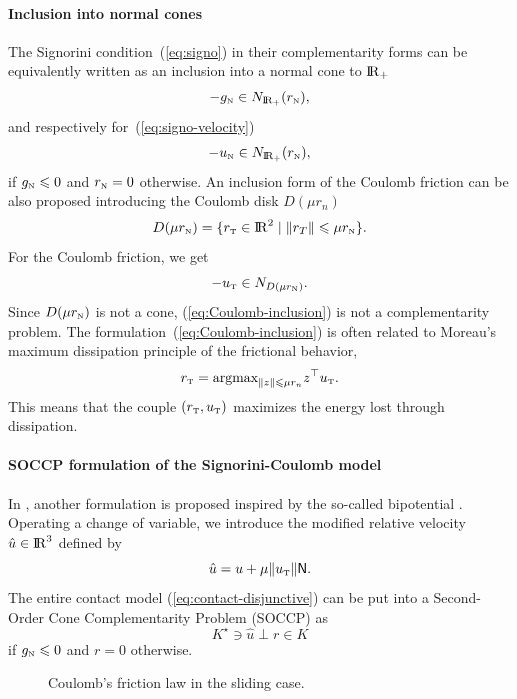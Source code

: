 \paragraph{Inclusion into normal cones} The Signorini condition~(\ref{eq:signo}) in their complementarity forms can be equivalently written  as an inclusion into a normal cone to $\mathrm{I\!R}_+$
\begin{equation}
  \label{eq:signo-inclusion}
  - g_\n \in N_{\RR_+}(r_\n),
\end{equation}
and respectively for~(\ref{eq:signo-velocity})
\begin{equation}
  \label{eq:signo-inclusion-velo}
  - u_\n \in N_{\RR_+}(r_\n),
\end{equation}
if $g_{{\hbox{\tiny{N}}}} \leqslant 0$ and $r_{\hbox{\tiny{N}}} =0 $ otherwise. An inclusion form of the Coulomb friction can be also proposed introducing the Coulomb disk $D(\mu r_n)$
\begin{equation}
  \label{eq:diskR}
  D(\mu r_\n) = \{r_\t \in \RR^2\mid \|r_T\| \leq \mu r_\n   \}.
\end{equation}
For the Coulomb friction, we get
\begin{equation}
  \label{eq:Coulomb-inclusion}
  - u_{\t} \in N_{D(\mu r_\n)}.
\end{equation}
Since $D(\mu r_{\hbox{\tiny{N}}})$ is not a cone, (\ref{eq:Coulomb-inclusion}) is not a complementarity problem.  The formulation~(\ref{eq:Coulomb-inclusion}) is often related to Moreau's maximum dissipation principle of the frictional behavior,
\begin{equation}
  \label{eq:moreau-maxprinciple}
  r_\t = \mbox{argmax}_{\|z\| \leq \mu r_n}  z^\top u_\t.
\end{equation}
This means that the couple $(r_{\hbox{\tiny{T}}},u_{\hbox{\tiny{T}}})$ maximizes the energy lost through dissipation.


\paragraph{SOCCP formulation of the Signorini-Coulomb model}

In \cite{Acary.Brogliato2008,Acary.ea_ZAMM2011}, another formulation is proposed inspired by the so-called bipotential \cite{DeSaxce92,DeSaxce.Feng90,DeSaxce.Feng_MCM1998}. Operating a change of variable, we introduce the modified relative velocity $\hat u \in \mathrm{I\!R}^3$ defined by
\begin{equation}
  \label{eq:modified-velocity}
  \hat u = u +\mu \|u_\t\| \sf N.
\end{equation}
The entire contact model (\ref{eq:contact-disjunctive}) can be put into a Second-Order Cone Complementarity Problem (SOCCP) as
\begin{equation}
  \label{eq:contact-SOCCP}
 K^\star \ni \hat u \perp r \in K
\end{equation}
 if $ g_{\hbox{\tiny{N}}} \leqslant 0 $ and $r=0$ otherwise. 
\begin{figure}\centering
  \resizebox{!}{0.5\textheight}{}
  \caption{Coulomb's friction law in the sliding case.}
\label{fig:CoulombLawSliding}
\end{figure}

